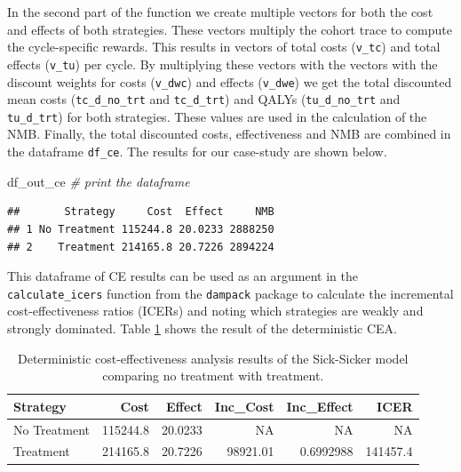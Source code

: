 \documentclass[
]{book}
\newenvironment{Shaded}{\begin{snugshade}}{\end{snugshade}}
\newcommand{\AttributeTok}[1]{\textcolor[rgb]{0.13,0.29,0.53}{#1}}
\newcommand{\CommentTok}[1]{\textcolor[rgb]{0.56,0.35,0.01}{\textit{#1}}}
\newcommand{\FunctionTok}[1]{\textcolor[rgb]{0.13,0.29,0.53}{\textbf{#1}}}
\newcommand{\NormalTok}[1]{#1}
\newcommand{\OtherTok}[1]{\textcolor[rgb]{0.56,0.35,0.01}{#1}}
\newcommand{\SpecialCharTok}[1]{\textcolor[rgb]{0.81,0.36,0.00}{\textbf{#1}}}
\begin{document}
In the second part of the function we create multiple vectors for both the cost and effects of both strategies. These vectors multiply the cohort trace to compute the cycle-specific rewards. This results in vectors of total costs (\texttt{v\_tc}) and total effects (\texttt{v\_tu}) per cycle. By multiplying these vectors with the vectors with the discount weights for costs (\texttt{v\_dwc}) and effects (\texttt{v\_dwe}) we get the total discounted mean costs (\texttt{tc\_d\_no\_trt} and \texttt{tc\_d\_trt}) and QALYs (\texttt{tu\_d\_no\_trt} and \texttt{tu\_d\_trt}) for both strategies. These values are used in the calculation of the NMB. Finally, the total discounted costs, effectiveness and NMB are combined in the dataframe \texttt{df\_ce}. The results for our case-study are shown below.

\begin{Shaded}
\begin{Highlighting}[]
\NormalTok{df\_out\_ce }\CommentTok{\# print the dataframe }
\end{Highlighting}
\end{Shaded}

\begin{verbatim}
##       Strategy     Cost  Effect     NMB
## 1 No Treatment 115244.8 20.0233 2888250
## 2    Treatment 214165.8 20.7226 2894224
\end{verbatim}

This dataframe of CE results can be used as an argument in the \texttt{calculate\_icers} function from the \texttt{dampack} package to calculate the incremental cost-effectiveness ratios (ICERs) and noting which strategies are weakly and strongly dominated. Table \ref{tab:df-cea-det} shows the result of the deterministic CEA.

\begin{Shaded}
\end{Shaded}

\begin{table}[!h]
\centering
\caption{\label{tab:df-cea-det}Deterministic cost-effectiveness analysis results of the Sick-Sicker model comparing no treatment with treatment.}
\centering
\begin{tabular}[t]{l|r|r|r|r|r}
\hline
Strategy & Cost & Effect & Inc\_Cost & Inc\_Effect & ICER\\
\hline
No Treatment & 115244.8 & 20.0233 & NA & NA & NA\\
\hline
Treatment & 214165.8 & 20.7226 & 98921.01 & 0.6992988 & 141457.4\\
\hline
\end{tabular}
\end{table}
\end{document}
